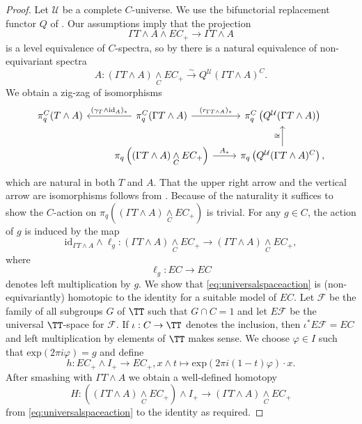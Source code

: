 \begin{proof}
Let $\mathcal{U}$ be a complete $C$-universe.
We use the bifunctorial
replacement functor $Q$ of \cite[Theorem~1.1, \pno~1494]{rvadams}. Our assumptions 
imply that the projection 
\[ \Gamma T\wedge A\wedge EC_+\to  \Gamma T\wedge A\]
 is a level equivalence of $C$-spectra, so by \cite[Main Theorem~1.7, \pno~1496]{rvadams} 
there is a natural equivalence of non-equivariant spectra
\[A:\left(\Gamma T\wedge A\right)\underset{C}{\wedge} EC_+\xrightarrow{\sim} Q^{\mathcal{U}}(\Gamma T\wedge A)^C.\]
We obtain a zig-zag of isomorphisms
\[
\begin{tikzcd}
\pi_q^C( T\wedge A)
&\pi_q^C( \Gamma T\wedge A)\arrow{l}[swap]{(\gamma_{ T}\wedge\mathrm{id}_A)_\ast}
\arrow{r}{(r_{ \Gamma T\wedge A})_\ast}
&\pi_q^C\left(  Q^{\mathcal{U}}( \Gamma T\wedge A) \right)
\\
&\pi_q\left(  \left( \Gamma T\wedge A\right)\underset{C}{\wedge} EC_+\right)
\arrow{r}{A_\ast}
&\pi_q\left(   Q^{\mathcal{U}}(\Gamma T\wedge A)^C \right)\arrow{u}{\cong},
\end{tikzcd}
\]
which are natural in both $T$ and $A$.
That the
upper right arrow and the vertical arrow
are isomorphisms follows from \cite[Theorem~1.1, \pno~1494]{rvadams}.
Because of the naturality it suffices to show the $C$-action on 
$\pi_q\left(  \left( \Gamma T\wedge A\right)\underset{C}{\wedge} EC_+\right)$
is trivial. For any $g\in C$, the action of $g$ is induced by the map
\begin{equation}\label{eq:universalspaceaction}
\mathrm{id}_{\Gamma T\wedge A}\wedge \ell_g: 
\left( \Gamma T\wedge A\right)\underset{C}{\wedge} EC_+ 
\to  \left( \Gamma T\wedge A\right)\underset{C}{\wedge} EC_+,
\end{equation}
where
\[\ell_g:EC\to EC\]
denotes left multiplication by $g$. 
We show that \eqref{eq:universalspaceaction} is (non-equivariantly) homotopic to the identity
for a suitable model of $EC$. Let $\mathcal{F}$ be the family
of all subgroups $G$ of $\TT$ such that $G\cap C = 1$
and let $E\mathcal{F}$ be the universal $\TT$-space
for $\mathcal{F}$. If $\iota:C\to \TT$ denotes the inclusion,
then $\iota^\ast E\mathcal{F} = EC$ and left multiplication
by elements of $\TT$ makes sense.
We choose $\varphi\in I$ such that $\mathrm{exp}(2\pi i \varphi) = g$
and define
\[h:EC_+\wedge I_+\to EC_+, x\wedge t\mapsto \mathrm{exp}(2\pi i (1-t)\varphi)\cdot x.\]
After smashing with $\Gamma T\wedge A$ we obtain a 
well-defined homotopy
\[H: \left(\left( \Gamma T\wedge A\right)\underset{C}{\wedge} EC_+\right) \wedge I_+
\to  \left( \Gamma T\wedge A\right)\underset{C}{\wedge} EC_+\]
from \eqref{eq:universalspaceaction} to the identity as required.


\end{proof}
